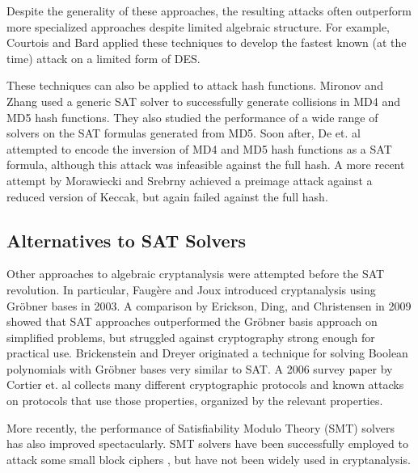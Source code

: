 Despite the generality of these approaches, the resulting attacks often outperform more specialized approaches despite limited algebraic structure. For example, Courtois and Bard \cite{CB07} applied these techniques to develop the fastest known (at the time) attack on a limited form of DES.

These techniques can also be applied to attack hash functions. Mironov and Zhang \cite{MZ06} used a generic SAT solver to successfully generate collisions in MD4 and MD5 hash functions. They also studied the performance of a wide range of solvers on the SAT formulas generated from MD5. Soon after, De et. al \cite{DKV07} attempted to encode the inversion of MD4 and MD5 hash functions as a SAT formula, although this attack was infeasible against the full hash. A more recent attempt by Morawiecki and Srebrny \cite{MS13} achieved a preimage attack against a reduced version of Keccak, but again failed against the full hash.

\subsection{Alternatives to SAT Solvers}
\label{sec:related:otherattacks}
Other approaches to algebraic cryptanalysis were attempted before the SAT revolution. In particular, Faug\`{e}re and Joux \cite{FJ03} introduced cryptanalysis using Gr\"{o}bner bases in 2003. A comparison by Erickson, Ding, and Christensen \cite{EDC09} in 2009 showed that SAT approaches outperformed the Gr\"{o}bner basis approach on simplified problems, but struggled against cryptography strong enough for practical use. Brickenstein and Dreyer \cite{BD09} originated a technique for solving Boolean polynomials with Gr\"{o}bner bases very similar to SAT. A 2006 survey paper by Cortier et. al \cite{CDL06} collects many different cryptographic protocols and known attacks on protocols that use those properties, organized by the relevant properties.

More recently, the performance of Satisfiability Modulo Theory (SMT) solvers has also improved spectacularly. \cite{BDMOS12} SMT solvers have been successfully employed to attack some small block ciphers \cite{Stanek14}, but have not been widely used in cryptanalysis.